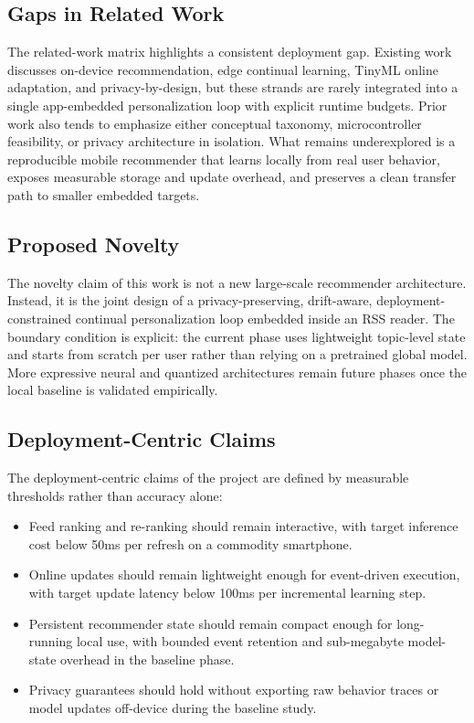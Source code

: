 \documentclass[11pt]{article}
\begin{document}
\subsection{Gaps in Related Work}
The related-work matrix highlights a consistent deployment gap. Existing work discusses on-device recommendation, edge continual learning, TinyML online adaptation, and privacy-by-design, but these strands are rarely integrated into a single app-embedded personalization loop with explicit runtime budgets. Prior work also tends to emphasize either conceptual taxonomy, microcontroller feasibility, or privacy architecture in isolation. What remains underexplored is a reproducible mobile recommender that learns locally from real user behavior, exposes measurable storage and update overhead, and preserves a clean transfer path to smaller embedded targets.

\subsection{Proposed Novelty}
The novelty claim of this work is not a new large-scale recommender architecture. Instead, it is the joint design of a privacy-preserving, drift-aware, deployment-constrained continual personalization loop embedded inside an RSS reader. The boundary condition is explicit: the current phase uses lightweight topic-level state and starts from scratch per user rather than relying on a pretrained global model. More expressive neural and quantized architectures remain future phases once the local baseline is validated empirically.

\subsection{Deployment-Centric Claims}
The deployment-centric claims of the project are defined by measurable thresholds rather than accuracy alone:

\begin{itemize}[leftmargin=*]
\item Feed ranking and re-ranking should remain interactive, with target inference cost below 50ms per refresh on a commodity smartphone.
\item Online updates should remain lightweight enough for event-driven execution, with target update latency below 100ms per incremental learning step.
\item Persistent recommender state should remain compact enough for long-running local use, with bounded event retention and sub-megabyte model-state overhead in the baseline phase.
\item Privacy guarantees should hold without exporting raw behavior traces or model updates off-device during the baseline study.
\end{itemize}
\end{document}
